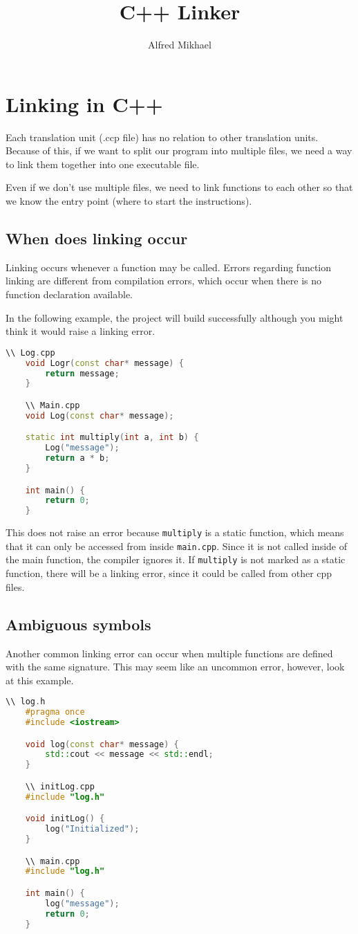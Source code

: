 \documentclass[english]{lni}
\author{Alfred Mikhael}
\title{C++ Linker}
\begin{document}
\section{Linking in C++}
Each translation unit (.ccp file) has no relation to other translation units.
Because of this, if we want to split our program into multiple files, we need
a way to link them together into one executable file.

Even if we don't use multiple files, we need to link functions to each other
so that we know the entry point (where to start the instructions).

\subsection{When does linking occur}
Linking occurs whenever a function may be called. Errors regarding function linking
are different from compilation errors, which occur when there is no function
declaration available.

In the following example, the project will build successfully although you might
think it would raise a linking error.
\begin{lstlisting}[language = C++]
    \\ Log.cpp
    void Logr(const char* message) {
        return message;
    }

    \\ Main.cpp
    void Log(const char* message);

    static int multiply(int a, int b) {
        Log("message");
        return a * b;
    }

    int main() {
        return 0;
    }
\end{lstlisting}
This does not raise an error because \verb$multiply$ is a static function, which means
that it can only be accessed from inside \verb$main.cpp$. Since it is not called inside
of the main function, the compiler ignores it. If \verb$multiply$ is not marked as a
static function, there will be a linking error, since it could be called from other cpp files.

\subsection{Ambiguous symbols}
Another common linking error can occur when multiple functions are defined with the same
signature. This may seem like an uncommon error, however, look at this example.

\begin{lstlisting}[language = C++]
    \\ log.h
    #pragma once
    #include <iostream>

    void log(const char* message) {
        std::cout << message << std::endl;
    }

    \\ initLog.cpp
    #include "log.h"

    void initLog() {
        log("Initialized");
    }

    \\ main.cpp 
    #include "log.h"

    int main() {
        log("message");
        return 0;
    }
\end{lstlisting}
\end{document}
